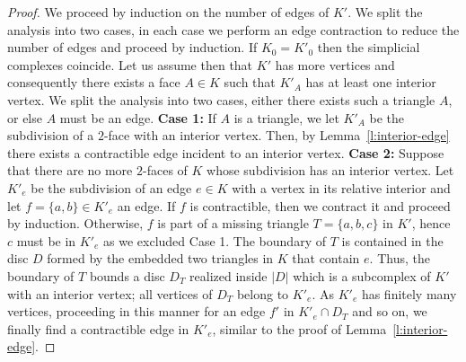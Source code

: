 \begin{proof}
   We proceed by induction on the number of edges of $K'$.
   We split the analysis into two cases, in each case we perform an edge contraction to reduce the number of edges and proceed by induction.
   If $K_0=K'_0$ then the simplicial complexes coincide. Let us assume then that $K'$ has more vertices and consequently there exists a face $A\in K$ such that $K'_A$ has at least one interior vertex. We split the analysis into two cases, either there exists such a triangle $A$, or else $A$ must be an edge.
%
   \noindent
   {\bf Case 1:} If $A$ is a triangle, we let $K'_A$ be the subdivision of a $2$-face with an interior vertex. Then, by Lemma~\ref{l:interior-edge} there exists a contractible edge incident to an interior vertex.
%
   \noindent
   {\bf Case 2:}  Suppose
    that there are no more $2$-faces of $K$ whose subdivision has an interior vertex. Let $K'_e$ be the subdivision of an edge $e\in K$ with a vertex in its relative interior and let $f=\{a,b\}\in K'_e$ an edge. If $f$ is contractible, then we contract it and proceed by induction. Otherwise, $f$ is part of a missing triangle $T=\{a,b,c\}$ in $K'$, hence $c$ must be in $K'_e$ as we excluded Case 1.
%
   The boundary of $T$ is contained in the disc $D$ formed by the embedded two triangles in $K$ that contain $e$. Thus, the boundary of $T$ bounds a disc $D_T$ realized inside $|D|$ which is a subcomplex of $K'$ with an interior vertex; all vertices of $D_T$ belong to $K'_e$.
   As $K'_e$ has finitely many vertices, proceeding in this manner for an edge $f'$ in $K'_e\cap D_T$ and so on, we finally find a contractible edge in $K'_e$,
similar to the proof of Lemma~\ref{l:interior-edge}.
\end{proof}
%
%

